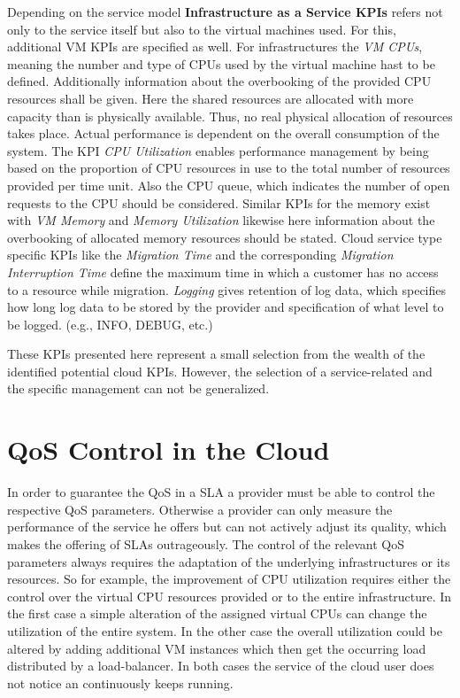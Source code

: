Depending on the service model \textbf{Infrastructure as a Service KPIs} refers not only to the service itself but also to the  virtual machines used. For this, additional VM KPIs are specified as well. For infrastructures the 
\emph{VM CPUs}, meaning the number and type of  CPUs used by the virtual machine hast to be defined. Additionally information about the overbooking of the provided CPU resources shall be given. Here the shared resources are allocated with more capacity than is physically available. Thus, no real physical allocation of resources takes place. Actual performance is dependent on the overall consumption of the system.  The KPI \emph{CPU Utilization} enables performance management by being based on the proportion of CPU resources in use to the total number of resources provided per time unit. Also the CPU queue, which indicates the number of open requests to the CPU should be considered. Similar KPIs for the memory exist with \emph{VM Memory} and \emph{Memory Utilization} likewise here information about the overbooking of allocated memory resources should be stated. Cloud service type specific KPIs like the \emph{Migration Time} and the corresponding \emph{Migration Interruption Time}  define the maximum time in which a customer has no access to a resource while migration. \emph{Logging}  gives retention of log data, which specifies how long log data to be stored by the provider and specification of what level to be logged. (e.g., INFO, DEBUG, etc.)

These KPIs presented here represent a small selection from the wealth of the identified potential cloud KPIs. However, the selection of a service-related and the specific management can not be generalized.

 \section{QoS Control in the Cloud}
In order to guarantee the QoS in a SLA a provider must be able to control the respective QoS parameters. Otherwise a provider can only measure the performance of the service he offers  but can not actively adjust its quality, which makes the offering of SLAs outrageously. The control of the relevant QoS parameters always requires the adaptation of the underlying infrastructures or its resources. So for example, the improvement of CPU utilization requires either  the control over the virtual CPU resources provided or to the entire infrastructure. In the first case a simple alteration of the assigned virtual CPUs can change the utilization of the entire system. In the other case the overall utilization could be altered by adding additional VM instances which then get the occurring load distributed by a load-balancer. In both cases the service of the cloud user does not notice an continuously keeps running. 

